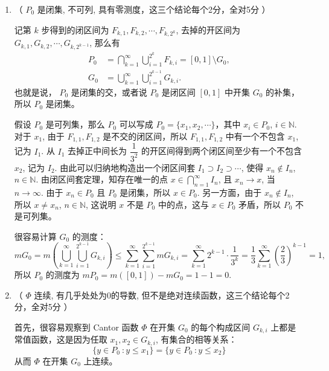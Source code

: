 \begin{solution}
  \begin{enumerate}
    \item （ \(P_0\) 是闭集, 不可列, 具有零测度，这三个结论每个2分，全对5分 ）

    记第 \(k\) 步得到的闭区间为 \(F_{k, 1}, F_{k, 2}, \cdots, F_{k, 2^k}\), 去掉的开区间为 \(G_{k, 1}, G_{k, 2}, \cdots, G_{k, 2^{k-1}}\), 那么有
    \[\begin{aligned}
    P_0 & = \bigcap\limits_{k=1}^{\infty} \bigcup\limits_{i=1}^{2^k} F_{k, i} = [0, 1] \setminus G_0, \\
    G_0 & = \bigcup\limits_{k=1}^{\infty} \bigcup\limits_{i=1}^{2^{k-1}} G_{k, i}.
    \end{aligned}\]
    也就是说， \(P_0\) 是闭集的交，或者说 \(P_0\) 是闭区间 \([0, 1]\) 中开集 \(G_0\) 的补集，所以 \(P_0\) 是闭集。

    假设 \(P_0\) 是可列集，那么 \(P_0\) 可以写成 \(P_0 = \{ x_1, x_2, \cdots \}\)，其中 \(x_i \in P_0\), \(i \in \mathbb{N}\). 对于 \(x_1\), 由于 \(F_{1, 1}, F_{1, 2}\) 是不交的闭区间，所以 \(F_{1, 1}, F_{1, 2}\) 中有一个不包含 \(x_1\), 记为 \(I_1\). 从 \(I_1\) 去掉正中间长为 \(\dfrac{1}{3^2}\) 的开区间得到两个闭区间至少有一个不包含 \(x_2\), 记为 \(I_2\). 由此可以归纳地构造出一个闭区间套 \(I_1 \supset I_2 \supset \cdots\), 使得 \(x_n \notin I_n\), \(n \in \mathbb{N}\). 由闭区间套定理，知存在唯一的点 \(x \in \bigcap\limits_{n=1}^{\infty} I_n\), 且 \(x_n \to x\), 当 \(n \to \infty\). 由于 \(x_n \in P_0\) 且 \(P_0\) 是闭集，所以 \(x \in P_0\). 另一方面，由于 \(x_n \notin I_n\), 所以 \(x \neq x_n\), \(n \in \mathbb{N}\), 这说明 \(x\) 不是 \(P_0\) 中的点，这与 \(x \in P_0\) 矛盾，所以 \(P_0\) 不是可列集。

    很容易计算 \(G_0\) 的测度：
    \[m G_0 = m \left( \bigcup\limits_{k=1}^{\infty} \bigcup\limits_{i=1}^{2^{k-1}} G_{k, i} \right) \leqslant \sum\limits_{k=1}^{\infty} \sum\limits_{i=1}^{2^{k-1}} m G_{k, i} = \sum\limits_{k=1}^{\infty} 2^{k-1} \cdot \dfrac{1}{3^k} = \dfrac{1}{3} \sum\limits_{k=1}^{\infty} \left( \dfrac{2}{3} \right)^{k-1} = 1,\]
    所以 \(P_0\) 的测度为 \(m P_0 = m ([0, 1]) - m G_0 = 1 - 1 = 0\).
    \item （ \(\Phi\) 连续, 有几乎处处为0的导数, 但不是绝对连续函数，这三个结论每个2分，全对5分 ）

    首先，很容易观察到 Cantor 函数 \(\Phi\) 在开集 \(G_0\) 的每个构成区间 \(G_{k, i}\) 上都是常值函数，这是因为任取 \(x_1, x_2 \in G_{k, i}\), 有集合的相等关系：
    \[\{y \in P_0 ~ \colon y \leqslant x_1\} = \{y \in P_0 ~ \colon y \leqslant x_2\}\]
    从而 \(\Phi\) 在开集 \(G_0\) 上连续。


\end{enumerate}
\end{solution}
